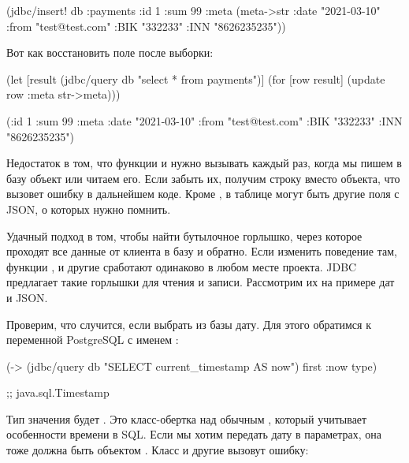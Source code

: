 \begin{english}
  \begin{clojure}
(jdbc/insert!
 db :payments
 {:id 1
  :sum 99
  :meta (meta->str {:date "2021-03-10"
                    :from "test@test.com"
                    :BIK "332233"
                    :INN "8626235235"})})
  \end{clojure}
\end{english}

Вот как восстановить поле  после выборки:

\begin{english}
  \begin{clojure}
(let [result
      (jdbc/query db "select * from payments")]
  (for [row result]
    (update row :meta str->meta)))

({:id 1
  :sum 99
  :meta {:date "2021-03-10"
         :from "test@test.com"
         :BIK "332233"
         :INN "8626235235"}})
  \end{clojure}
\end{english}

Недостаток в том, что функции  и  нужно вызывать каждый раз, когда мы пишем в базу объект или читаем его. Если забыть их, получим строку вместо объекта, что вызовет ошибку в дальнейшем коде. Кроме , в таблице могут быть другие поля с JSON, о которых нужно помнить.

Удачный подход в том, чтобы найти бутылочное горлышко, через которое проходят все данные от клиента в базу и обратно. Если изменить поведение там, функции ,  и другие сработают одинаково в любом месте проекта. JDBC предлагает такие горлышки для чтения и записи. Рассмотрим их на примере дат и JSON.

Проверим, что случится, если выбрать из базы дату. Для этого обратимся к переменной PostgreSQL с именем :

\begin{english}
  \begin{clojure}
(-> (jdbc/query db "SELECT current_timestamp AS now")
    first
    :now
    type)

;; java.sql.Timestamp
  \end{clojure}
\end{english}

Тип значения будет . Это класс-обертка над обычным , который учитывает особенности времени в SQL. Если мы хотим передать дату в параметрах, она тоже должна быть объектом . Класс  и другие вызовут ошибку:

